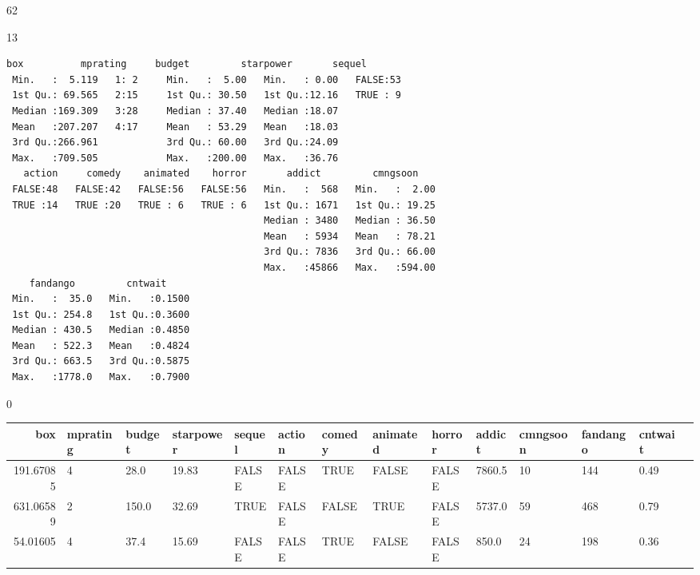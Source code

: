 \documentclass[11pt]{article}
\begin{document}
    
    62

    
    13

    
    
    \begin{Verbatim}[commandchars=\\\{\}]
      box          mprating     budget         starpower       sequel  
 Min.   :  5.119   1: 2     Min.   :  5.00   Min.   : 0.00   FALSE:53  
 1st Qu.: 69.565   2:15     1st Qu.: 30.50   1st Qu.:12.16   TRUE : 9  
 Median :169.309   3:28     Median : 37.40   Median :18.07             
 Mean   :207.207   4:17     Mean   : 53.29   Mean   :18.03             
 3rd Qu.:266.961            3rd Qu.: 60.00   3rd Qu.:24.09             
 Max.   :709.505            Max.   :200.00   Max.   :36.76             
   action     comedy    animated    horror       addict         cmngsoon     
 FALSE:48   FALSE:42   FALSE:56   FALSE:56   Min.   :  568   Min.   :  2.00  
 TRUE :14   TRUE :20   TRUE : 6   TRUE : 6   1st Qu.: 1671   1st Qu.: 19.25  
                                             Median : 3480   Median : 36.50  
                                             Mean   : 5934   Mean   : 78.21  
                                             3rd Qu.: 7836   3rd Qu.: 66.00  
                                             Max.   :45866   Max.   :594.00  
    fandango         cntwait      
 Min.   :  35.0   Min.   :0.1500  
 1st Qu.: 254.8   1st Qu.:0.3600  
 Median : 430.5   Median :0.4850  
 Mean   : 522.3   Mean   :0.4824  
 3rd Qu.: 663.5   3rd Qu.:0.5875  
 Max.   :1778.0   Max.   :0.7900  
    \end{Verbatim}

    
    0

    
    \begin{tabular}{r|lllllllllllll}
 box & mprating & budget & starpower & sequel & action & comedy & animated & horror & addict & cmngsoon & fandango & cntwait\\
\hline
	 191.67085 & 4         &  28.0     & 19.83     & FALSE     & FALSE     & TRUE      & FALSE     & FALSE     & 7860.5    & 10        & 144       & 0.49     \\
	 631.06589 & 2         & 150.0     & 32.69     & TRUE      & FALSE     & FALSE     & TRUE      & FALSE     & 5737.0    & 59        & 468       & 0.79     \\
	  54.01605 & 4         &  37.4     & 15.69     & FALSE     & FALSE     & TRUE      & FALSE     & FALSE     &  850.0    & 24        & 198       & 0.36     \\
\end{tabular}
\end{document}

